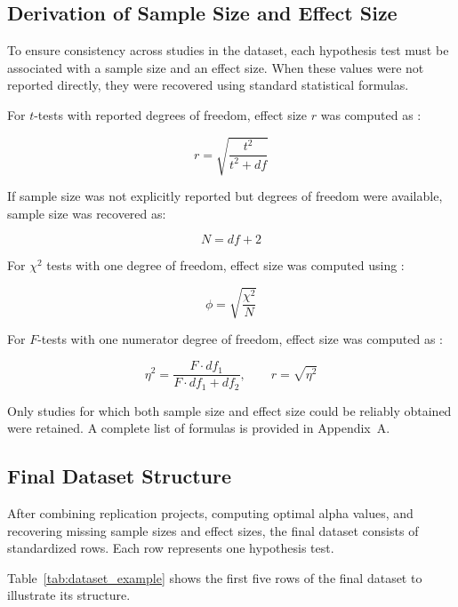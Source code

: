 {\subsection{Derivation of Sample Size and Effect Size}
\label{subsec:SampleEfeectCalc}
To ensure consistency across studies in the dataset, each hypothesis test must be associated with a sample size and an effect size. When these values were not reported directly, they were recovered using standard statistical formulas.

For $t$-tests with reported degrees of freedom, effect size $r$ was computed as \cite{becker2000}:

\begin{equation}
	r = \sqrt{\frac{t^2}{t^2 + df}}
\end{equation}

If sample size was not explicitly reported but degrees of freedom were available, sample size was recovered as\cite{Cohen1988}:

\begin{equation}
	N = df + 2
\end{equation}

For $\chi^2$ tests with one degree of freedom, effect size was computed using \cite{kim2017}:

\begin{equation}
	\phi = \sqrt{\frac{\chi^2}{N}}
\end{equation}

For $F$-tests with one numerator degree of freedom, effect size was computed as \cite{RICHARDSON2011}:

\begin{equation}
	\eta^2 = \frac{F \cdot df_1}{F \cdot df_1 + df_2},
	\qquad
	r = \sqrt{\eta^2} 
\end{equation}

Only studies for which both sample size and effect size could be reliably obtained were retained. A complete list of formulas is provided in Appendix~A.

\subsection{Final Dataset Structure}

After combining replication projects, computing optimal alpha values, and recovering missing sample sizes and effect sizes, the final dataset consists of standardized rows. Each row represents one hypothesis test.

Table~\ref{tab:dataset_example} shows the first five rows of the final dataset to illustrate its structure.

}
